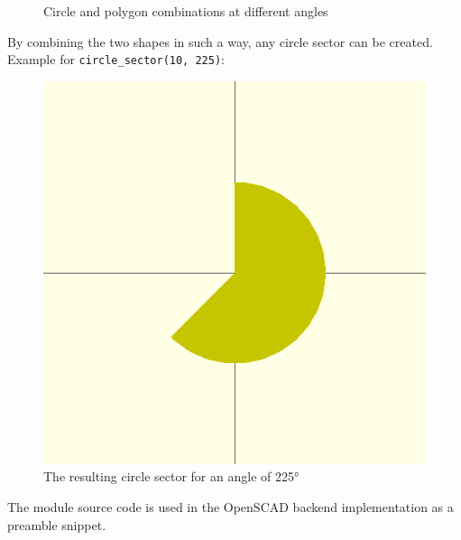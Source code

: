 \begin{figure}[H]
	\caption{Circle and polygon combinations at different angles}
	\label{img:circle_shape_angles}
\end{figure}

\noindent By combining the two shapes in such a way, any circle sector can be
created. Example for \texttt{circle\_sector(10, 225)}:

\begin{figure}[H]
	\centering
	\includegraphics[width=.70\textwidth]{images/cs_225_result}
	\caption{The resulting circle sector for an angle of 225\si{\degree}}
	\label{img:circle_shape_result}
\end{figure}

\noindent The module source code is used in the OpenSCAD backend implementation
as a preamble snippet.
